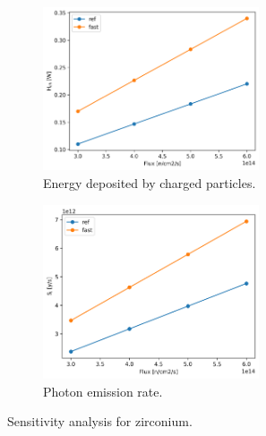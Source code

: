 \begin{figure}[htbp!] %
  \centering
  \begin{subfigure}[b]{0.49\textwidth}
    \centering
    \includegraphics[width=0.7\textwidth]{figures/fast-res40_hch}
    \caption{Energy deposited by charged particles.}
  \end{subfigure}
  \hfill
  \begin{subfigure}[b]{0.49\textwidth}
    \centering
    \includegraphics[width=0.7\textwidth]{figures/fast-res40_Si}
    \caption{Photon emission rate.}
  \end{subfigure}
  \hfill
  \caption{Sensitivity analysis for zirconium.}
  \label{fig:sens-zr}
\end{figure}

